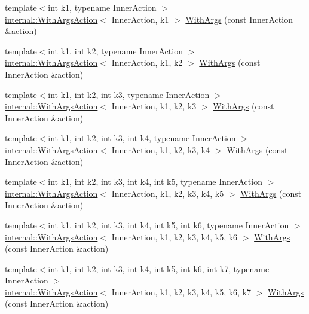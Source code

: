 \begin{DoxyCompactItemize}
\item 
{\footnotesize template$<$int k1, typename Inner\+Action $>$ }\\\mbox{\hyperlink{classtesting_1_1internal_1_1WithArgsAction}{internal\+::\+With\+Args\+Action}}$<$ Inner\+Action, k1 $>$ \mbox{\hyperlink{namespacetesting_a3bd9eef13bee9065b19d3cd571829c7c}{With\+Args}} (const Inner\+Action \&action)
\item 
{\footnotesize template$<$int k1, int k2, typename Inner\+Action $>$ }\\\mbox{\hyperlink{classtesting_1_1internal_1_1WithArgsAction}{internal\+::\+With\+Args\+Action}}$<$ Inner\+Action, k1, k2 $>$ \mbox{\hyperlink{namespacetesting_aa82fc09250ba172220e6fb7e77249e74}{With\+Args}} (const Inner\+Action \&action)
\item 
{\footnotesize template$<$int k1, int k2, int k3, typename Inner\+Action $>$ }\\\mbox{\hyperlink{classtesting_1_1internal_1_1WithArgsAction}{internal\+::\+With\+Args\+Action}}$<$ Inner\+Action, k1, k2, k3 $>$ \mbox{\hyperlink{namespacetesting_a999614cb785165b9a44a9a95a3753407}{With\+Args}} (const Inner\+Action \&action)
\item 
{\footnotesize template$<$int k1, int k2, int k3, int k4, typename Inner\+Action $>$ }\\\mbox{\hyperlink{classtesting_1_1internal_1_1WithArgsAction}{internal\+::\+With\+Args\+Action}}$<$ Inner\+Action, k1, k2, k3, k4 $>$ \mbox{\hyperlink{namespacetesting_a646a2e4ac7866ee8c486cb167ba9b45e}{With\+Args}} (const Inner\+Action \&action)
\item 
{\footnotesize template$<$int k1, int k2, int k3, int k4, int k5, typename Inner\+Action $>$ }\\\mbox{\hyperlink{classtesting_1_1internal_1_1WithArgsAction}{internal\+::\+With\+Args\+Action}}$<$ Inner\+Action, k1, k2, k3, k4, k5 $>$ \mbox{\hyperlink{namespacetesting_aa36b0c7216df96bdacf9fe491afd40bd}{With\+Args}} (const Inner\+Action \&action)
\item 
{\footnotesize template$<$int k1, int k2, int k3, int k4, int k5, int k6, typename Inner\+Action $>$ }\\\mbox{\hyperlink{classtesting_1_1internal_1_1WithArgsAction}{internal\+::\+With\+Args\+Action}}$<$ Inner\+Action, k1, k2, k3, k4, k5, k6 $>$ \mbox{\hyperlink{namespacetesting_a6df9cd27659e5943b5d3d77fc4f102e3}{With\+Args}} (const Inner\+Action \&action)
\item 
{\footnotesize template$<$int k1, int k2, int k3, int k4, int k5, int k6, int k7, typename Inner\+Action $>$ }\\\mbox{\hyperlink{classtesting_1_1internal_1_1WithArgsAction}{internal\+::\+With\+Args\+Action}}$<$ Inner\+Action, k1, k2, k3, k4, k5, k6, k7 $>$ \mbox{\hyperlink{namespacetesting_a04146a27847141c6942e9c67a85aadbe}{With\+Args}} (const Inner\+Action \&action)

\end{DoxyCompactItemize}
